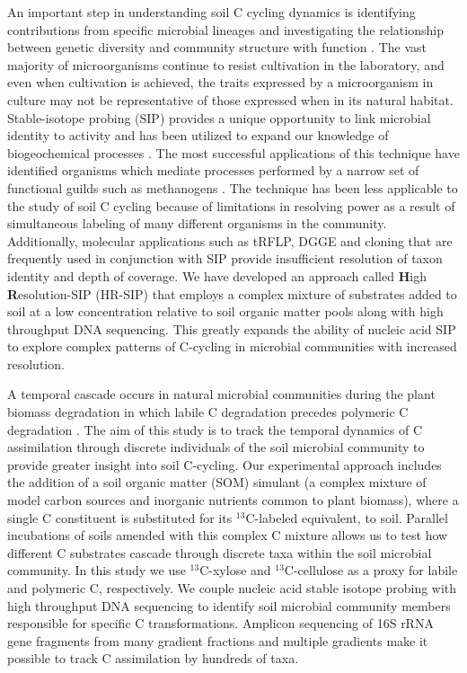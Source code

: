 An important step in understanding soil C cycling dynamics is identifying
contributions from specific microbial lineages and investigating the
relationship between genetic diversity and community structure with function
\citep{O_Donnell_2002}. The vast majority of microorganisms continue to resist
cultivation in the laboratory, and even when cultivation is achieved, the
traits expressed by a microorganism in culture may not be representative of
those expressed when in its natural habitat. Stable-isotope probing (SIP)
provides a unique opportunity to link microbial identity to activity and has
been utilized to expand our knowledge of biogeochemical processes
\citep{Chen_Murrell_2010}. The most successful applications of this technique
have identified organisms which mediate processes performed by a narrow set of
functional guilds such as methanogens \citep{Lu_2005}. The technique has been
less applicable to the study of soil C cycling because of limitations in
resolving power as a result of simultaneous labeling of many different
organisms in the community. Additionally, molecular applications such as tRFLP,
DGGE and cloning that are frequently used in conjunction with SIP provide
insufficient resolution of taxon identity and depth of coverage. We have
developed an approach called \textbf{H}igh \textbf{R}esolution-SIP (HR-SIP)
that employs a complex mixture of substrates added to soil at a low
concentration relative to soil organic matter pools along with high throughput
DNA sequencing. This greatly expands the ability of nucleic acid SIP to explore
complex patterns of C-cycling in microbial communities with increased
resolution.

A temporal cascade occurs in natural microbial communities during the plant
biomass degradation in which labile C degradation precedes polymeric C
degradation \citep{Hu_1997,Rui_2009}.  The aim of this study is to track the
temporal dynamics of C assimilation through discrete individuals of the soil
microbial community to provide greater insight into soil C-cycling.  Our
experimental approach includes the addition of a soil organic matter (SOM) simulant
(a complex mixture of model carbon sources and inorganic nutrients common to
plant biomass), where a single C constituent is substituted for its
$^{13}$C-labeled equivalent, to soil.  Parallel incubations of soils amended
with this complex C mixture allows us to test how different C substrates
cascade through discrete taxa within the soil microbial community.  In this
study we use $^{13}$C-xylose and $^{13}$C-cellulose as a proxy for labile and
polymeric C, respectively.  We couple nucleic acid stable isotope probing with
high throughput DNA sequencing to identify soil microbial community members
responsible for specific C transformations.  Amplicon sequencing of 16S rRNA
gene fragments from many gradient fractions and multiple gradients make it
possible to track C assimilation by hundreds of taxa.
